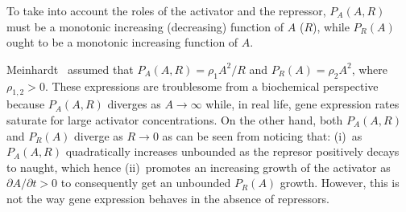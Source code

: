 \documentclass[%
 preprint,
 aip, 
 amsmath,amssymb,
]{revtex4-2}
\begin{document}
To take into account the roles of the activator and the repressor, $P_A(A, R)$ must be a monotonic increasing (decreasing) function of $A$ ($R$), while $P_R(A)$ ought to be a monotonic increasing function of $A$. 

Meinhardt~\cite{Meinhardt1982} assumed that $P_A(A, R) = \displaystyle \rho_1 A^2/R$ and $P_R(A) = \rho_2 A^2$, where $\rho_{1,2}>0$.
These expressions are troublesome from a biochemical perspective because $P_A(A, R)$ diverges as $A \to \infty$ while, in real life, gene expression rates saturate for large activator concentrations. On the other hand, both $P_A(A, R)$ and $P_R(A)$ diverge as $R \to 0$ as can be seen from noticing that: (i)~as $P_A(A,R)$ quadratically increases unbounded as the represor positively decays to naught, which hence (ii)~promotes an increasing growth of the activator as $\partial A/\partial t>0$ to consequently get an unbounded $P_R(A)$ growth. However, this is not the way gene expression behaves in the absence of repressors.
\end{document}
